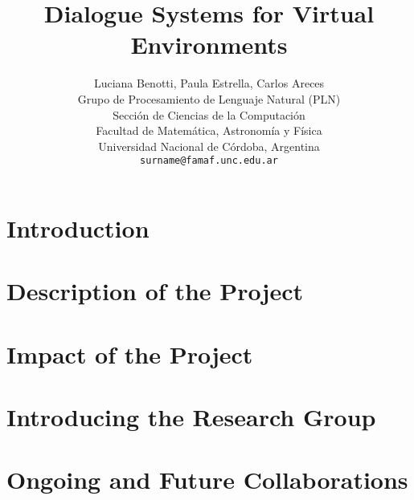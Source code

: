 \documentclass[11pt,letterpaper]{article}
\title{Dialogue Systems for Virtual Environments}
\author{Luciana Benotti, Paula Estrella, Carlos Areces \\
 Grupo de Procesamiento de Lenguaje Natural (PLN) \\
Secci\'on de Ciencias de la Computaci\'on \\
Facultad de Matem\'atica, Astronom\'ia y F\'isica \\
Universidad Nacional de C\'ordoba, Argentina \\
  {\tt surname@famaf.unc.edu.ar}
}
\date{}
\begin{document}
\maketitle
\begin{abstract}
\end{abstract}

\section{Introduction}\label{intro}


\section{Description of the Project}\label{description}


\section{Impact of the Project}\label{impact}


\section{Introducing the Research Group}\label{group}


\section{Ongoing and Future Collaborations}\label{collaboration}





\end{document}
